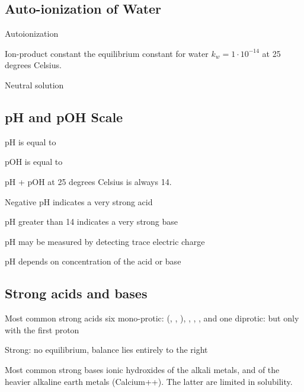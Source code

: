 \begin{mdframed}
\begin{multicols}{2}
\subsection{Auto-ionization of Water}
\begin{compactdesc}
    \item[Autoionization] 
    \item[Ion-product constant] the equilibrium constant for water
        $k_w = 1\cdot10^{-14}$ at 25 degrees Celsius.
    \item[Neutral solution] \ce{[H+] = [OH^-]}
\end{compactdesc}

\subsection{pH and pOH Scale}
\begin{compactdesc}
\item[pH] is equal to 
\item[pOH] is equal to 
\item[pH + pOH] at 25 degrees Celsius is always 14.
\item[Negative pH] indicates a very strong acid
\item[pH greater than 14] indicates a very strong base
\item[pH may be measured] by detecting trace electric charge
\item[pH depends on] concentration of the acid or base
\end{compactdesc}

\end{multicols}
\end{mdframed}




\begin{mdframed}
\begin{multicols}{2}
\subsection{Strong acids and bases}
\begin{compactdesc}
\item[Most common strong acids] six mono-protic:
    (, , ), , , ,
    and one diprotic:  but only with the first proton
\item[Strong:] no equilibrium, balance lies entirely to the right
\item[Most common strong bases] ionic hydroxides of the alkali metals, and
    of the heavier alkaline earth metals (Calcium++). The latter are limited
    in solubility.
\end{compactdesc}
\end{multicols}
\end{mdframed}




